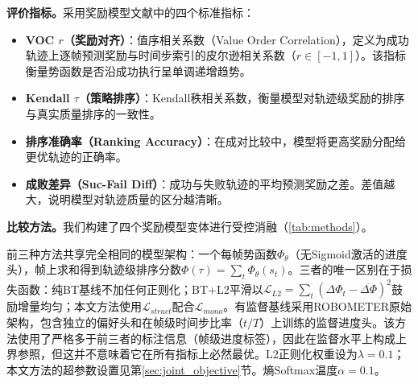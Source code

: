 \textbf{评价指标。}采用奖励模型文献中的四个标准指标\cite{ma2024generative,robometer2026}：
\begin{itemize}[leftmargin=*,noitemsep]
    \item \textbf{VOC $r$（奖励对齐）}：值序相关系数（Value Order Correlation）\cite{ma2024generative}，定义为成功轨迹上逐帧预测奖励与时间步索引的皮尔逊相关系数（$r \in [-1, 1]$）。该指标衡量势函数是否沿成功执行呈单调递增趋势。
    \item \textbf{Kendall $\tau$（策略排序）}：Kendall秩相关系数，衡量模型对轨迹级奖励的排序与真实质量排序的一致性。
    \item \textbf{排序准确率（Ranking Accuracy）}：在成对比较中，模型将更高奖励分配给更优轨迹的正确率。
    \item \textbf{成败差异（Suc-Fail Diff）}：成功与失败轨迹的平均预测奖励之差。差值越大，说明模型对轨迹质量的区分越清晰。
\end{itemize}

\textbf{比较方法。}我们构建了四个奖励模型变体进行受控消融（\cref{tab:methods}）。

\begin{table}[ht]
    \centering
    \caption{四种比较方法的配置。前三种仅使用成对偏好标签，有监督基线额外使用帧级进度标签，构成监督水平上的上界参照。}
    \label{tab:methods}
\end{table}

前三种方法共享完全相同的模型架构：一个每帧势函数$\Phi_\theta$（无Sigmoid激活的进度头），帧上求和得到轨迹级排序分数$\Phi(\tau) = \sum_{t} \Phi_\theta(s_t)$。三者的唯一区别在于损失函数：纯BT基线不加任何正则化；BT+L2平滑以$\mathcal{L}_{L2} = \sum_t (\Delta\Phi_t - \overline{\Delta\Phi})^2$鼓励增量均匀；本文方法使用$\mathcal{L}_{struct}$配合$\mathcal{L}_{mono}$。有监督基线采用ROBOMETER原始架构，包含独立的偏好头和在帧级时间步比率（$t/T$）上训练的监督进度头。该方法使用了严格多于前三者的标注信息（帧级进度标签），因此在监督水平上构成上界参照，但这并不意味着它在所有指标上必然最优。L2正则化权重设为$\lambda = 0.1$；本文方法的超参数设置见第\ref{sec:joint_objective}节。熵Softmax温度$\alpha = 0.1$。

